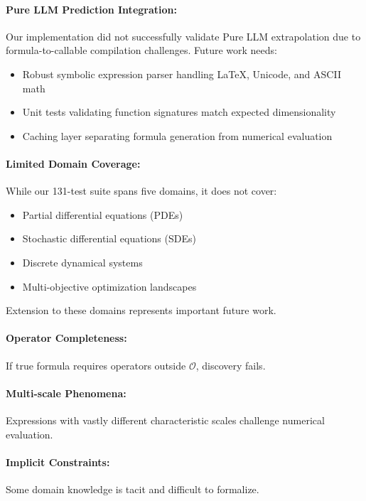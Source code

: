 \documentclass[twoside,11pt]{article}
\begin{document}
\paragraph{Pure LLM Prediction Integration:} Our implementation did not successfully validate Pure LLM extrapolation due to formula-to-callable compilation challenges. Future work needs:
\begin{itemize}
\item Robust symbolic expression parser handling LaTeX, Unicode, and ASCII math
\item Unit tests validating function signatures match expected dimensionality
\item Caching layer separating formula generation from numerical evaluation
\end{itemize}

\paragraph{Limited Domain Coverage:} While our 131-test suite spans five domains, it does not cover:
\begin{itemize}
\item Partial differential equations (PDEs)
\item Stochastic differential equations (SDEs)
\item Discrete dynamical systems
\item Multi-objective optimization landscapes
\end{itemize}

Extension to these domains represents important future work.

\paragraph{Operator Completeness:} If true formula requires operators outside $\mathcal{O}$, discovery fails.

\paragraph{Multi-scale Phenomena:} Expressions with vastly different characteristic scales challenge numerical evaluation.

\paragraph{Implicit Constraints:} Some domain knowledge is tacit and difficult to formalize.
\end{document}
